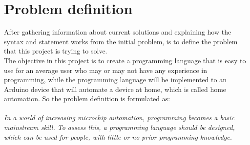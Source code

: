 \section{Problem definition}
 After gathering information about current solutions and explaining how the syntax and statement works from the initial problem, is to define the problem that this project is trying to solve. \\ The objective in this project is to create a programming language that is easy to use for an average user who may or may not have any experience in programming, while the programming language will be implemented to an Arduino device that will automate a device at home, which is called home automation. So the problem definition is formulated as:\\
\\


\textit{In a world of increasing microchip automation, programming becomes a basic mainstream skill. To assess this, a programming language should be designed, which can be used for people, with little or no prior programming knowledge.}